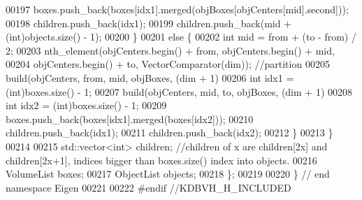 \begin{DoxyCode}
00197       boxes.push\_back(boxes[idx1].merged(objBoxes[objCenters[mid].second]));
00198       children.push\_back(idx1);
00199       children.push\_back(mid + (\textcolor{keywordtype}{int})objects.size() - 1);
00200     \}
00201     \textcolor{keywordflow}{else} \{
00202       \textcolor{keywordtype}{int} mid = from + (to - from) / 2;
00203       nth\_element(objCenters.begin() + from, objCenters.begin() + mid,
00204                   objCenters.begin() + to, VectorComparator(dim)); \textcolor{comment}{//partition}
00205       build(objCenters, from, mid, objBoxes, (dim + 1) %
00206       \textcolor{keywordtype}{int} idx1 = (int)boxes.size() - 1;
00207       build(objCenters, mid, to, objBoxes, (dim + 1) %
00208       \textcolor{keywordtype}{int} idx2 = (int)boxes.size() - 1;
00209       boxes.push\_back(boxes[idx1].merged(boxes[idx2]));
00210       children.push\_back(idx1);
00211       children.push\_back(idx2);
00212     \}
00213   \}
00214 
00215   std::vector<int> children; \textcolor{comment}{//children of x are children[2x] and children[2x+1], indices bigger than
       boxes.size() index into objects.}
00216   VolumeList boxes;
00217   ObjectList objects;
00218 \};
00219 
00220 \} \textcolor{comment}{// end namespace Eigen}
00221 
00222 \textcolor{preprocessor}{#endif //KDBVH\_H\_INCLUDED}
\end{DoxyCode}
